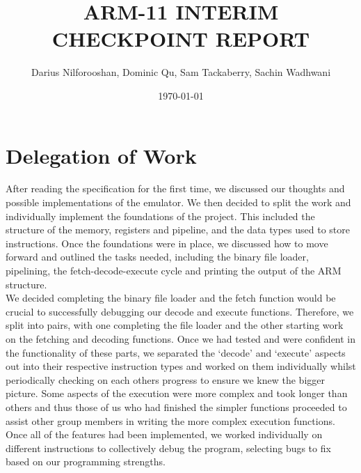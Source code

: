 \documentclass [10pt] {article}
\title{ARM-11 INTERIM CHECKPOINT REPORT}
\author{Darius Nilforooshan, Dominic Qu, Sam Tackaberry, Sachin Wadhwani}
\date{\today}
\begin{document}
\maketitle

\section*{Delegation of Work}
After reading the specification for the first time, we discussed our thoughts and possible implementations of the emulator. We then decided to split the work and individually implement the foundations of the project. This included the structure of the memory, registers and pipeline, and the data types used to store instructions. Once the foundations were in place, we discussed how to move forward and outlined the tasks needed, including the binary file loader, pipelining, the fetch-decode-execute cycle and printing the output of the ARM structure.
\vspace {0.3cm}
\\
We decided completing the binary file loader and the fetch function would be crucial to successfully debugging our decode and execute functions. Therefore, we split into pairs, with one completing the file loader and the other starting work on the fetching and decoding functions. Once we had tested and were confident in the functionality of these parts, we separated the ‘decode’ and ‘execute’ aspects out into their respective instruction types and worked on them individually whilst periodically checking on each others progress to ensure we knew the bigger picture. Some aspects of the execution were more complex and took longer than others and thus those of us who had finished the simpler functions proceeded to assist other group members in writing the more complex execution functions. Once all of the features had been implemented, we worked individually on different instructions to collectively debug the program, selecting bugs to fix based on our programming strengths.
\end{document}
